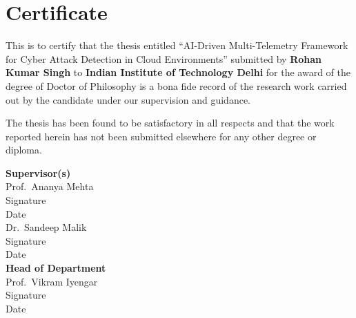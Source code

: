 \chapter*{Certificate}
This is to certify that the thesis entitled ``AI-Driven Multi-Telemetry Framework for Cyber Attack Detection in Cloud Environments'' submitted by \textbf{Rohan Kumar Singh} to \textbf{Indian Institute of Technology Delhi} for the award of the degree of Doctor of Philosophy is a bona fide record of the research work carried out by the candidate under our supervision and guidance.

The thesis has been found to be satisfactory in all respects and that the work reported herein has not been submitted elsewhere for any other degree or diploma.

\vspace{1.5cm}
\begin{flushleft}
\textbf{Supervisor(s)}\\[1cm]
Prof.~Ananya Mehta \\ Signature \\ Date\\[1.5cm]
Dr.~Sandeep Malik \\ Signature \\ Date\\[1.5cm]
\textbf{Head of Department}\\[1cm]
Prof.~Vikram Iyengar \\ Signature \\ Date
\end{flushleft}
\cleardoublepage
